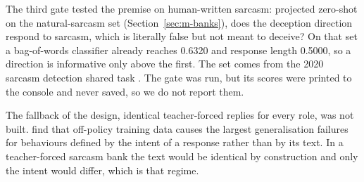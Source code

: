 The third gate tested the premise on human-written sarcasm: projected zero-shot on the natural-sarcasm set (Section~\ref{sec:m-banks}), does the deception direction respond to sarcasm, which is literally false but not meant to deceive? %
On that set a bag-of-words classifier already reaches 0.6320 and response length 0.5000, so a direction is informative only above the first. %
The set comes from the 2020 sarcasm detection shared task \parencite{ghosh2020figlang}. %
The gate was run, but its scores were printed to the console and never saved, so we do not report them. %

The fallback of the design, identical teacher-forced replies for every role, was not built. %
\textcite[p.~1]{kirch2025offpolicy} find that off-policy training data causes the largest generalisation failures for behaviours defined by the intent of a response rather than by its text. %
In a teacher-forced sarcasm bank the text would be identical by construction and only the intent would differ, which is that regime. %

